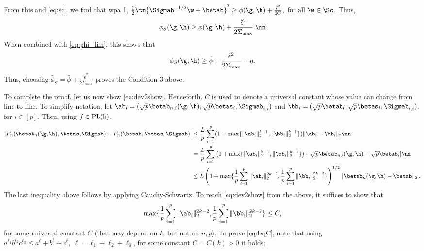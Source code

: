 From this and \eqref{eq:sc}, we find that wpa 1,
$
\frac{1}{2}\tn{\Sigmab^{-1/2}\w+\betab}^2 \geq \phi(\g,\h) + \frac{\tilde\epsilon^2}{2C},~\text{for all}~ \w\in\Sc.
$
Thus, 
\begin{align}
\phi_S(\g,\h) \geq \phi(\g,\h) + \frac{\tilde\epsilon^2}{2\Sigma_{\max}}.\nn
\end{align}
When combined with \eqref{eq:phi_lim}, this shows that
\begin{align}
\phi_S(\g,\h) \geq \bar\phi + \frac{\tilde\epsilon^2}{2\Sigma_{\max}} - \eta.
\end{align}
Thus, choosing $\bar\phi_S = \bar\phi + \frac{\tilde\epsilon^2}{2\Sigma_{\max}}$ proves the Condition 3 above. 

To complete the proof, let us now show \eqref{eq:dev2show}. Henceforth, $C$ is used to denote a universal constant whose value can change from line to line.
To simplify notation, let $\ab_i=(\sqrt{p}\betab_{n,i}(\g,\h),\sqrt{p}\betas_i,\Sigmab_{i,i})$ and $\bb_i=(\sqrt{p}\betab_i,\sqrt{p}\betas_i,\Sigmab_{i,i})$, for $i\in[p]$. Then, using $f\in\rm{PL}(k)$,
\begin{align}
|F_n(\betab_n(\g,\h),\betas,\Sigmab) - F_n(\betab,\betas,\Sigmab)| &\leq \frac{L}{p}\sum_{i=1}^p (1+\max\{\|\ab_i\|_2^{k-1},\|\bb_i\|_2^{k-1}\})\|\ab_i-\bb_i\|_2\nn \\
&= \frac{L}{p}\sum_{i=1}^p \left(1+\max\{\|\ab_i\|_2^{k-1},\|\bb_i\|_2^{k-1}\}\right)\cdot|\sqrt{p}\betab_{n,i}(\g,\h) - \sqrt{p}\betab_i|\nn\\
&\leq L\left(1+\max\{\frac{1}{p}\sum_{i=1}^p \|\ab_i\|_2^{2k-2},\frac{1}{p}\sum_{i=1}^p\|\bb_i\|_2^{2k-2}\} \right)^{1/2}{\|\betab_{n}(\g,\h) - \betab\|_2}\label{eq:LipC}\,.
\end{align}
The last inequality above follows by applying Cauchy-Schwartz.  
To reach \eqref{eq:dev2show} from the above, it suffices to show that
\begin{align}
\max\{\frac{1}{p}\sum_{i=1}^p \|\ab_i\|_2^{2k-2},\frac{1}{p}\sum_{i=1}^p\|\bb_i\|_2^{2k-2}\} \leq C,\label{eq:leqC}
\end{align}
for some universal constant $C$ (that may depend on $k$, but not on $n,p$).
To prove \eqref{eq:leqC}, note that 
 using $a^{\ell_1}b^{\ell_2}c^{\ell_3}\leq a^{\ell}+b^{\ell}+c^\ell,~\ell=\ell_1+\ell_2+\ell_3$, for some constant $C=C(k)>0$ it holds:
